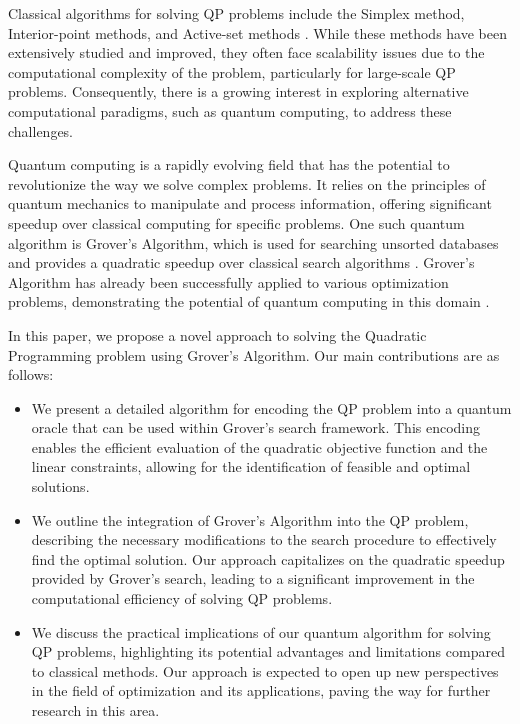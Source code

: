 Classical algorithms for solving QP problems include the Simplex method, Interior-point methods, and Active-set methods \cite{nash2000survey}. While these methods have been extensively studied and improved, they often face scalability issues due to the computational complexity of the problem, particularly for large-scale QP problems. Consequently, there is a growing interest in exploring alternative computational paradigms, such as quantum computing, to address these challenges.

Quantum computing is a rapidly evolving field that has the potential to revolutionize the way we solve complex problems. It relies on the principles of quantum mechanics to manipulate and process information, offering significant speedup over classical computing for specific problems. One such quantum algorithm is Grover's Algorithm, which is used for searching unsorted databases and provides a quadratic speedup over classical search algorithms \cite{grover1996fast}. Grover's Algorithm has already been successfully applied to various optimization problems, demonstrating the potential of quantum computing in this domain \cite{daskin2011quantum}.

In this paper, we propose a novel approach to solving the Quadratic Programming problem using Grover's Algorithm. Our main contributions are as follows:

\begin{itemize}
\item We present a detailed algorithm for encoding the QP problem into a quantum oracle that can be used within Grover's search framework. This encoding enables the efficient evaluation of the quadratic objective function and the linear constraints, allowing for the identification of feasible and optimal solutions.

\item We outline the integration of Grover's Algorithm into the QP problem, describing the necessary modifications to the search procedure to effectively find the optimal solution. Our approach capitalizes on the quadratic speedup provided by Grover's search, leading to a significant improvement in the computational efficiency of solving QP problems.

\item We discuss the practical implications of our quantum algorithm for solving QP problems, highlighting its potential advantages and limitations compared to classical methods. Our approach is expected to open up new perspectives in the field of optimization and its applications, paving the way for further research in this area.
\end{itemize}

